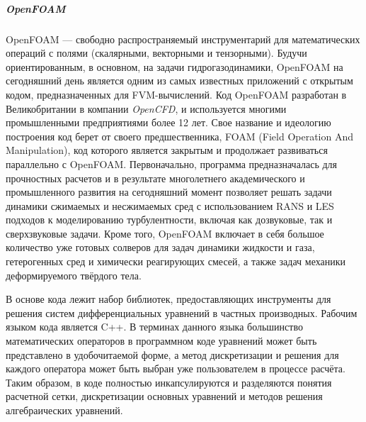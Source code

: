 	\subparagraph{OpenFOAM\\}
		\hspace{2em}OpenFOAM — свободно распространяемый инструментарий для математических операций с полями (скалярными, векторными и тензорными). Будучи ориентированным, в основном, на задачи гидрогазодинамики, OpenFOAM на сегодняшний день является одним из самых известных приложений с открытым кодом, предназначенных для FVM-вычислений.\cite{openfoam}
		Код OpenFOAM разработан в Великобритании в компании \textit{OpenCFD}, и используется многими промышленными предприятиями более 12 лет. Свое название и идеологию построения код берет от своего предшественника, FOAM (Field Operation And Manipulation), код которого является закрытым и продолжает развиваться параллельно с OpenFOAM. Первоначально, программа предназначалась для прочностных расчетов и в результате многолетнего академического и промышленного развития на сегодняшний момент позволяет решать задачи динамики сжимаемых и несжимаемых сред с использованием RANS и LES подходов к моделированию турбулентности, включая как дозвуковые, так и сверхзвуковые задачи. Кроме того, OpenFOAM включает в себя большое количество уже готовых солверов для задач динамики жидкости и газа, гетерогенных сред и химически реагирующих смесей, а также задач механики деформируемого твёрдого тела.

	В основе кода лежит набор библиотек, предоставляющих инструменты для решения систем дифференциальных уравнений в частных производных. Рабочим языком кода является C++. В терминах данного языка большинство математических операторов в программном коде уравнений может быть представлено в удобочитаемой форме, а метод дискретизации и решения для каждого оператора может быть выбран уже пользователем в процессе расчёта. Таким образом, в коде полностью инкапсулируются и разделяются понятия расчетной сетки, дискретизации основных уравнений и методов решения алгебраических уравнений.
